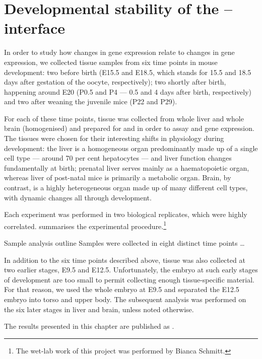 \chapter{Developmental stability of the \mrna--\trna interface}

In order to study how changes in \mrna gene expression relate to changes in
\trna gene expression, we collected tissue samples from six time points in mouse
development: two before birth (E15.5 and E18.5, which stands for \num{15.5} and
\num{18.5} days after gestation of the oocyte, respectively); two shortly after
birth, happening around E20 (P0.5 and P4 --- \num{0.5} and \num{4} days after
birth, respectively) and two after weaning the juvenile mice (P22 and P29).

For each of these time points, tissue was collected from whole liver and whole
brain (homogenised) and prepared for \rnaseq and  \chipseq in order to
assay \mrna and \trna gene expression. The tissues were chosen for their
interesting shifts in physiology during development: the liver is a homogeneous
organ predominantly made up of a single cell type --- around \num{70} per cent
hepatocytes --- and liver function changes fundamentally at birth;
prenatal liver serves mainly as a haematopoietic organ, whereas liver of
post-natal mice is primarily a metabolic organ. Brain, by contrast, is
a highly heterogeneous organ made up of many different cell types, with dynamic
changes all through development.

Each experiment was performed in two biological replicates, which were highly
correlated.  summarises the experimental
procedure.\footnote{The wet-lab work of this project was performed by Bianca
Schmitt.} 

    {Sample analysis outline}
    {Samples were collected in eight distinct time points …}

In addition to the six time points described above, tissue was also collected at
two earlier stages, E9.5 and E12.5. Unfortunately, the embryo at such early
stages of development are too small to permit collecting enough tissue-specific
material. For that reason, we used the whole embryo at E9.5 and separated the
E12.5 embryo into torso and upper body. The subsequent analysis was performed on
the six later stages in liver and brain, unless noted otherwise.

The results presented in this chapter are published as \citet{Schmitt:2014}.

